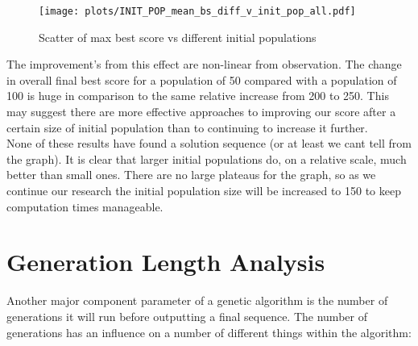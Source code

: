 \begin{figure}[h]
    \texttt{[image: plots/INIT\_POP\_mean\_bs\_diff\_v\_init\_pop\_all.pdf]}
    \caption{Scatter of max best score vs different initial populations}\label{fig:INIT-POP-mean-bs-v-init-pop-all}
\end{figure}

The improvement's from this effect are non-linear from observation.
The change in overall final best score for a population of 50 compared with a population of 100 is huge in comparison to the same relative increase from 200 to 250.
This may suggest there are more effective approaches to improving our score after a certain size of initial population than to continuing to increase it further. \\



None of these results have found a solution sequence (or at least we cant tell from the graph).
It is clear that larger initial populations do, on a relative scale, much better than small ones.
There are no large plateaus for the graph, so as we continue our research the initial population size will be increased to 150 to keep computation times manageable.\\


\section{Generation Length Analysis}\label{sec:generationlengthanalysis}
Another major component parameter of a genetic algorithm is the number of generations it will run before outputting a final sequence.
The number of generations has an influence on a number of different things within the algorithm:

